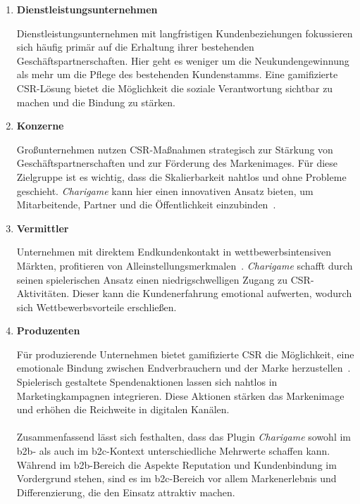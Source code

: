\begin{enumerate}
    \item \textbf{Dienstleistungsunternehmen}

Dienstleistungsunternehmen mit langfristigen Kundenbeziehungen fokussieren sich häufig primär auf die Erhaltung ihrer bestehenden Geschäftspartnerschaften.
Hier geht es weniger um die Neukundengewinnung als mehr um die Pflege des bestehenden Kundenstamms.
Eine gamifizierte CSR-Lösung bietet die Möglichkeit die soziale Verantwortung sichtbar zu machen und die Bindung zu stärken.

    \item \textbf{Konzerne}

Großunternehmen nutzen CSR-Maßnahmen strategisch zur Stärkung von Geschäftspartnerschaften und zur Förderung des Markenimages.
Für diese Zielgruppe ist es wichtig, dass die Skalierbarkeit nahtlos und ohne Probleme geschieht.
    \textit{Charigame} kann hier einen innovativen Ansatz bieten, um Mitarbeitende, Partner und die Öffentlichkeit einzubinden~\cite{BMAS_CSRTipps}.

    \item \textbf{Vermittler}

Unternehmen mit direktem Endkundenkontakt in wettbewerbsintensiven Märkten, profitieren von Alleinstellungsmerkmalen~\cite{Kessler2025_Wettbewerbsvorteil}.
    \textit{Charigame} schafft durch seinen spielerischen Ansatz einen niedrigschwelligen Zugang zu CSR-Aktivitäten.
Dieser kann die Kundenerfahrung emotional aufwerten, wodurch sich Wettbewerbsvorteile erschließen.

    \item \textbf{Produzenten}

Für produzierende Unternehmen bietet gamifizierte CSR die Möglichkeit, eine emotionale Bindung zwischen Endverbrauchern und der Marke herzustellen~\cite{zhang2025csr}.
Spielerisch gestaltete Spendenaktionen lassen sich nahtlos in Marketingkampagnen integrieren.
Diese Aktionen stärken das Markenimage und erhöhen die Reichweite in digitalen Kanälen.\\\\
Zusammenfassend lässt sich festhalten, dass das Plugin \textit{Charigame} sowohl im \gls{b2b}- als auch im \gls{b2c}-Kontext unterschiedliche Mehrwerte schaffen kann.
Während im \gls{b2b}-Bereich die Aspekte Reputation und Kundenbindung im Vordergrund stehen, sind es im \gls{b2c}-Bereich vor allem Markenerlebnis und Differenzierung, die den Einsatz attraktiv machen.
\end{enumerate}

